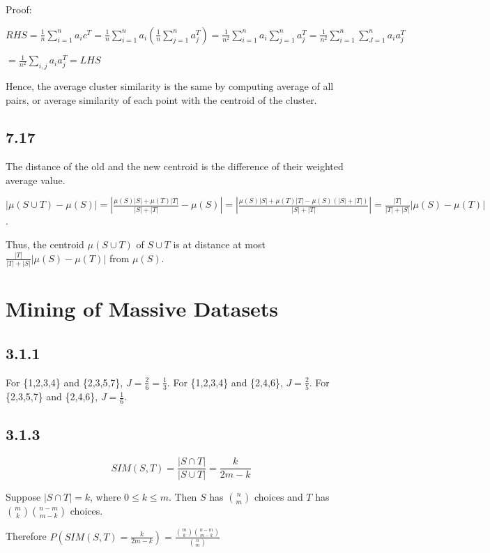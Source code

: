 \documentclass[a4paper, 11pt]{article}
\begin{document}
Proof:

$RHS = \frac{1}{n} \sum_{i=1}^n a_i c^T = \frac{1}{n} \sum_{i=1}^n a_i (\frac{1}{n} \sum_{j = 1}^n a_j^T) = \frac{1}{n^2} \sum_{i=1}^n a_i \sum_{j=1}^n a_j^T = \frac{1}{n^2} \sum_{i=1}^n \sum_{J=1}^n a_i a_j^T $

$= \frac{1}{n^2} \sum_{i,j} a_i a_j^T = LHS$

Hence, the average cluster similarity is the same by computing average of all pairs, or average similarity of each point with the centroid of the cluster.

\subsection*{7.17}

The distance of the old and the new centroid is the difference of their weighted average value.

$|\mu (S \cup T) - \mu (S)| = |\frac{\mu (S) |S| + \mu (T) |T|}{|S| + |T|} - \mu (S)| = |\frac{\mu (S) |S| + \mu (T) |T| - \mu (S) (|S| + |T|)}{|S| + |T|}| = \frac{|T|}{|T|+|S|} |\mu (S) - \mu (T)|$.

Thus, the centroid $\mu (S \cup T)$ of $S \cup T$ is at distance at most $\frac{|T|}{|T|+|S|} |\mu (S) - \mu (T)|$ from $\mu (S)$.


\section*{Mining of Massive Datasets}

\subsection*{3.1.1}

For \{1,2,3,4\} and \{2,3,5,7\},  $J = \frac{2}{6} = \frac{1}{3}$. For \{1,2,3,4\} and \{2,4,6\}, $J = \frac{2}{5}$. For \{2,3,5,7\} and \{2,4,6\},  $J = \frac{1}{6}$.

\subsection*{3.1.3}

$$SIM(S,T) = \frac{|S \cap T|}{|S \cup T|} = \frac{k}{2m - k}$$

Suppose $|S \cap T| = k$, where $0 \leq k \leq m$. Then $S$ has $\binom{n}{m}$ choices and $T$ has $\binom{m}{k} \binom{n - m}{m - k}$ choices.

Therefore $P(SIM(S,T) = \frac{k}{2m - k}) = \frac{\binom{m}{k}\binom{n - m}{m - k}}{\binom nm}$
\end{document}
